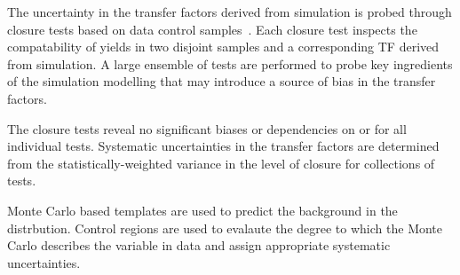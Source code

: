 The uncertainty in the transfer factors derived from simulation is
probed through closure tests based on data control
samples~\cite{RA1Paper2012}. Each closure test inspects the
compatability of yields in two disjoint samples and a corresponding TF
derived from simulation. A large ensemble of tests are performed to
probe key ingredients of the simulation modelling that may introduce a
source of bias in the transfer factors.

%

The closure tests reveal no significant biases or dependencies on
\njet or \scalht for all individual tests. Systematic uncertainties in
the transfer factors are determined from the statistically-weighted
variance in the level of closure for collections of
tests. 

Monte Carlo based templates are used to predict the background in the \MHT distrbution. Control regions are used to evalaute the degree to which the Monte Carlo describes the variable in data and assign appropriate systematic uncertainties.


